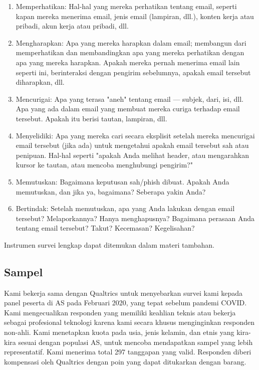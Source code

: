 \documentclass[lettersize,journal]{IEEEtran}
\begin{document}
\begin{enumerate}
  \item{Memperhatikan}: Hal-hal yang mereka perhatikan tentang email, seperti kapan mereka menerima email, jenis email (lampiran, dll.), konten kerja atau pribadi, akun kerja atau pribadi, dll.
  \item{Mengharapkan}: Apa yang mereka harapkan dalam email; membangun dari memperhatikan dan membandingkan apa yang mereka perhatikan dengan apa yang mereka harapkan. Apakah mereka pernah menerima email lain seperti ini, berinteraksi dengan pengirim sebelumnya, apakah email tersebut diharapkan, dll.
  \item{Mencurigai}: Apa yang terasa "aneh" tentang email — subjek, dari, isi, dll. Apa yang ada dalam email yang membuat mereka curiga terhadap email tersebut. Apakah itu berisi tautan, lampiran, dll.
  \item{Menyelidiki}: Apa yang mereka cari secara eksplisit setelah mereka mencurigai email tersebut (jika ada) untuk mengetahui apakah email tersebut sah atau penipuan. Hal-hal seperti "apakah Anda melihat header, atau mengarahkan kursor ke tautan, atau mencoba menghubungi pengirim?"
  \item{Memutuskan}: Bagaimana keputusan sah/phish dibuat. Apakah Anda memutuskan, dan jika ya, bagaimana? Seberapa yakin Anda?
  \item{Bertindak}: Setelah memutuskan, apa yang Anda lakukan dengan email tersebut? Melaporkannya? Hanya menghapusnya? Bagaimana perasaan Anda tentang email tersebut? Takut? Kecemasan? Kegelisahan?
\end{enumerate}

Instrumen survei lengkap dapat ditemukan dalam materi tambahan.

\subsection{Sampel}

Kami bekerja sama dengan Qualtrics untuk menyebarkan survei kami kepada panel peserta di AS pada Februari 2020, yang tepat sebelum pandemi COVID. Kami mengecualikan responden yang memiliki keahlian teknis atau bekerja sebagai profesional teknologi karena kami secara khusus menginginkan responden non-ahli. Kami menetapkan kuota pada usia, jenis kelamin, dan etnis yang kira-kira sesuai dengan populasi AS, untuk mencoba mendapatkan sampel yang lebih representatif. Kami menerima total 297 tanggapan yang valid. Responden diberi kompensasi oleh Qualtrics dengan poin yang dapat ditukarkan dengan barang.
\end{document}
